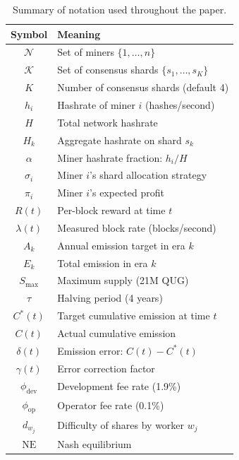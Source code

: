\documentclass[11pt,a4paper]{article}
\theoremstyle{definition}
\theoremstyle{remark}
\newcommand{\QUG}{\textsf{QUG}}
\newcommand{\Nash}{\mathrm{NE}}
\newcommand{\payoff}{\pi}
\newcommand{\strategy}{\sigma}
\newcommand{\Players}{\mathcal{N}}
\newcommand{\hashrate}{h}
\newcommand{\Hashrate}{H}
\newcommand{\reward}{R}
\newcommand{\blockrate}{\lambda}
\begin{document}
\begin{table}[H]
\centering
\caption{Summary of notation used throughout the paper.}
\label{tab:notation}
\begin{tabular}{@{}cl@{}}
\toprule
\textbf{Symbol} & \textbf{Meaning} \\
\midrule
$\Players$ & Set of miners $\{1, \ldots, n\}$ \\
$\mathcal{K}$ & Set of consensus shards $\{s_1, \ldots, s_K\}$ \\
$K$ & Number of consensus shards (default 4) \\
$\hashrate_i$ & Hashrate of miner $i$ (hashes/second) \\
$\Hashrate$ & Total network hashrate \\
$\Hashrate_k$ & Aggregate hashrate on shard $s_k$ \\
$\alpha$ & Miner hashrate fraction: $\hashrate_i / \Hashrate$ \\
$\strategy_i$ & Miner $i$'s shard allocation strategy \\
$\payoff_i$ & Miner $i$'s expected profit \\
$\reward(t)$ & Per-block reward at time $t$ \\
$\blockrate(t)$ & Measured block rate (blocks/second) \\
$A_k$ & Annual emission target in era $k$ \\
$E_k$ & Total emission in era $k$ \\
$S_{\max}$ & Maximum supply (21M \QUG{}) \\
$\tau$ & Halving period (4 years) \\
$C^*(t)$ & Target cumulative emission at time $t$ \\
$C(t)$ & Actual cumulative emission \\
$\delta(t)$ & Emission error: $C(t) - C^*(t)$ \\
$\gamma(t)$ & Error correction factor \\
$\phi_{\text{dev}}$ & Development fee rate (1.9\%) \\
$\phi_{\text{op}}$ & Operator fee rate (0.1\%) \\
$d_{w_j}$ & Difficulty of shares by worker $w_j$ \\
$\Nash$ & Nash equilibrium \\
\bottomrule
\end{tabular}
\end{table}
\end{document}
